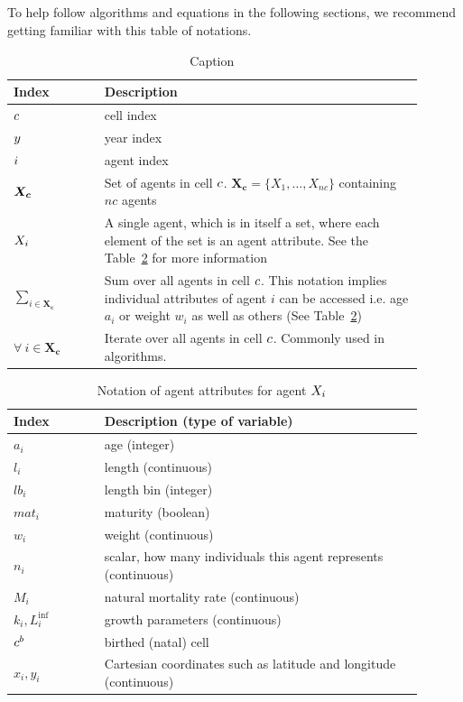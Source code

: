 \subsection{\label{sec:key notaiton}}
To help follow algorithms and equations in the following sections, we recommend getting familiar with this table of notations.

\begin{table}[H]
	\centering
	\begin{tabular}{p{0.2\linewidth} | p{0.7\linewidth}}
		Index  & Description \\ 
		\hline
		\(c\) & cell index \\
		\(y\) & year index \\
		\(i\) & agent index \\
		\(\bm{X_c}\) & Set of agents in cell \(c\). \(\bm{X_c} = \{X_1, \dots, X_{nc}\}\) containing \(nc\) agents\\
		\(X_i\) & A single agent, which is in itself a set, where each element of the set is an agent attribute. See the Table~\ref{tab:agent_atrtributes} for more information\\
		\(\sum\limits_{i \in \bm{X_c}}\) & Sum over all agents in cell \(c\). This notation implies individual attributes of agent \(i\) can be accessed i.e. age \(a_i\) or weight \(w_i\) as well as others (See Table~\ref{tab:agent_atrtributes})\\
		\(\forall \ i \in \bm{X_c}\) & Iterate over all agents in cell \(c\). Commonly used in algorithms.
		
	\end{tabular}
	\caption{Caption}
	\label{tab:notation}
\end{table}

\begin{table}[H]
	\centering
	\begin{tabular}{p{0.2\linewidth} | p{0.7\linewidth}}
		Index  & Description (type of variable) \\ 
		\hline
		\(a_i\) & age (integer) \\
		\(l_i\) & length (continuous)\\	
		\(lb_i\) & length bin (integer)\\
		\(mat_i\) & maturity (boolean)\\		
		\(w_i\) & weight (continuous)\\
		\(n_i\) & scalar, how many individuals this agent represents  (continuous)\\		
	 	\(M_i\) & natural mortality rate (continuous)\\	
	 	\(k_i, L_i^{\inf}\) & growth parameters (continuous)\\	
	 	\(c^b\) & birthed (natal) cell\\	
		\(x_i, y_i\) & Cartesian coordinates such as latitude and longitude (continuous)	 		 						
	\end{tabular}
	\caption{Notation of agent attributes for agent \(X_i\)}
	\label{tab:agent_atrtributes}
\end{table}


